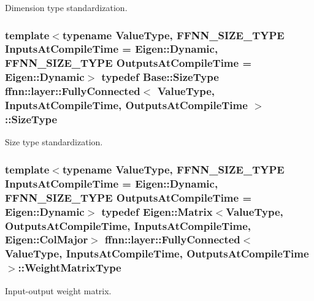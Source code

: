 Dimension type standardization. 

\hypertarget{classffnn_1_1layer_1_1_fully_connected_ae1b5e64828482a4c3eea0e2b0ba3f826}{
\subsubsection[{Size\-Type}]{\setlength{\rightskip}{0pt plus 5cm}template$<$typename Value\-Type, F\-F\-N\-N\-\_\-\-S\-I\-Z\-E\-\_\-\-T\-Y\-P\-E Inputs\-At\-Compile\-Time = Eigen\-::\-Dynamic, F\-F\-N\-N\-\_\-\-S\-I\-Z\-E\-\_\-\-T\-Y\-P\-E Outputs\-At\-Compile\-Time = Eigen\-::\-Dynamic$>$ typedef {\bf Base\-::\-Size\-Type} {\bf ffnn\-::layer\-::\-Fully\-Connected}$<$ Value\-Type, Inputs\-At\-Compile\-Time, Outputs\-At\-Compile\-Time $>$\-::{\bf Size\-Type}}}\label{classffnn_1_1layer_1_1_fully_connected_ae1b5e64828482a4c3eea0e2b0ba3f826}


Size type standardization. 

\hypertarget{classffnn_1_1layer_1_1_fully_connected_a4ceb72064ac9a73a0907cc369d229da0}{
\subsubsection[{Weight\-Matrix\-Type}]{\setlength{\rightskip}{0pt plus 5cm}template$<$typename Value\-Type, F\-F\-N\-N\-\_\-\-S\-I\-Z\-E\-\_\-\-T\-Y\-P\-E Inputs\-At\-Compile\-Time = Eigen\-::\-Dynamic, F\-F\-N\-N\-\_\-\-S\-I\-Z\-E\-\_\-\-T\-Y\-P\-E Outputs\-At\-Compile\-Time = Eigen\-::\-Dynamic$>$ typedef Eigen\-::\-Matrix$<$Value\-Type, Outputs\-At\-Compile\-Time, Inputs\-At\-Compile\-Time, Eigen\-::\-Col\-Major$>$ {\bf ffnn\-::layer\-::\-Fully\-Connected}$<$ Value\-Type, Inputs\-At\-Compile\-Time, Outputs\-At\-Compile\-Time $>$\-::{\bf Weight\-Matrix\-Type}}}\label{classffnn_1_1layer_1_1_fully_connected_a4ceb72064ac9a73a0907cc369d229da0}


Input-\/output weight matrix. 



